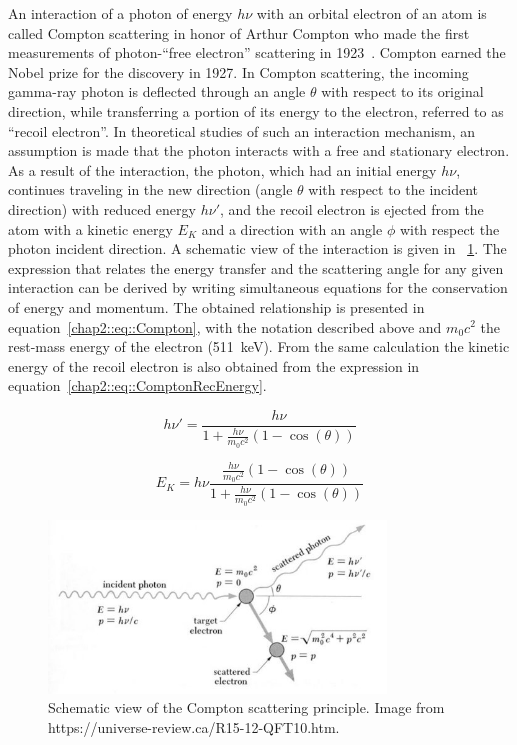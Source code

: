 An interaction of a photon of energy $h\nu$  with an orbital electron of an atom is called Compton scattering in honor of Arthur Compton who made the first measurements of photon-\enquote{free electron} scattering in 1923~\parencite{Compton1923}. Compton earned the Nobel prize for the discovery in 1927.  
In Compton scattering, the incoming gamma-ray photon is deflected through an angle $\theta$ with respect to its original direction, while transferring a portion of its energy to the electron, referred to as \enquote{recoil electron}. In theoretical studies of such an interaction mechanism, an assumption is made that the photon interacts with a free and stationary electron. As a result of the interaction, the photon, which had an initial energy $h\nu$, continues traveling in the new direction (angle $\theta$ with respect to the incident direction) with reduced energy $h\nu'$, and the recoil electron is ejected from the atom with a kinetic energy $E_K$ and a direction with an angle $\phi$ with respect the photon incident direction. A schematic view of the interaction is given in \figurename~\ref{chap2::fig::compton_principle}.
The expression that relates the energy transfer and the scattering angle for any given interaction can be derived by writing simultaneous equations for the conservation of energy and momentum. The obtained relationship is presented in equation~\ref{chap2::eq::Compton}, with the notation described above and $m_{0}c^2$ the rest-mass energy of the electron (511~keV). From the same calculation the kinetic energy of the recoil electron is also obtained from the expression in equation~\ref{chap2::eq::ComptonRecEnergy}.

\begin{equation}
h\nu' = \frac{h\nu}{1+\frac{h\nu}{m_{0}c^2}(1-\cos(\theta))}
\label{chap2::eq::Compton}
\end{equation} 

\begin{equation}
E_K = h\nu \frac{\frac{h\nu}{m_0c^2} (1-\cos(\theta))}{1+\frac{h\nu}{m_{0}c^2}(1-\cos(\theta))}
\label{chap2::eq::ComptonRecEnergy}
\end{equation} 

\begin{figure}[!htbp]
\centering
\includegraphics[width=0.8\textwidth]{03_GraphicFiles/chapter2_GammaCameras/ComptonPrinciple.jpg}
\caption{Schematic view of the Compton scattering principle. Image from https://universe-review.ca/R15-12-QFT10.htm.}
\label{chap2::fig::compton_principle}
\end{figure} 

